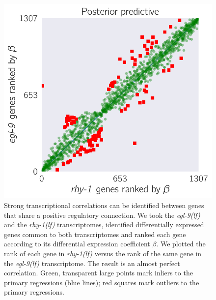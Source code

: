\documentclass[9pt,twocolumn,twoside]{pnas-new}
\newcommand{\egl}{\emph{egl-9(lf)}}
\newcommand{\rhy}{\emph{rhy-1(lf)}}
\begin{document}
\begin{figure}%
\centering
\includegraphics[width=\linewidth]{figs/multiplemodes-eb.pdf}
\caption{
Strong transcriptional correlations can be identified between genes
that share a positive regulatory connection. We took the \egl{} and the \rhy{}
transcriptomes, identified differentially expressed genes common to both
transcriptomes and ranked each gene according to its differential expression
coefficient $\beta$. We plotted the rank of each gene in \rhy{} versus the
rank of the same gene in the \egl{} transcriptome. The result is an almost
perfect correlation. Green, transparent large points mark inliers to the primary
regressions (blue lines); red squares mark outliers to the primary regressions.
}
\label{fig:genetic_interactions}
\end{figure}
\end{document}

